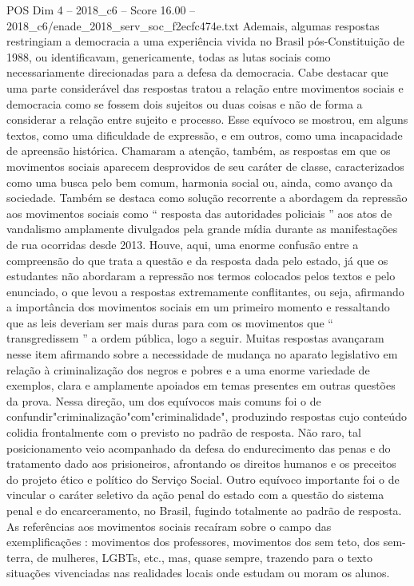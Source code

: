 \begin{textsample}{POS Dim 4 – 2018\_c6 – Score 16.00 – 2018\_c6/enade\_2018\_serv\_soc\_f2ecfc474e.txt}
Ademais, algumas respostas restringiam a democracia a uma experiência vivida no Brasil pós-Constituição de 1988, ou identificavam, genericamente, todas as lutas sociais como necessariamente direcionadas para a defesa da democracia.
Cabe destacar que uma parte considerável das respostas tratou a relação entre movimentos sociais e democracia como se fossem dois sujeitos ou duas coisas e não de forma a considerar a relação entre sujeito e processo.
Esse equívoco se mostrou, em alguns textos, como uma dificuldade de expressão, e em outros, como uma incapacidade de apreensão histórica.
Chamaram a atenção, também, as respostas em que os movimentos sociais aparecem desprovidos de seu caráter de classe, caracterizados como uma busca pelo bem comum, harmonia social ou, ainda, como avanço da sociedade.
Também se destaca como solução recorrente a abordagem da repressão aos movimentos sociais como “ resposta das autoridades policiais ” aos atos de vandalismo amplamente divulgados pela grande mídia durante as manifestações de rua ocorridas desde 2013.
Houve, aqui, uma enorme confusão entre a compreensão do que trata a questão e da resposta dada pelo estado, já que os estudantes não abordaram a repressão nos termos colocados pelos textos e pelo enunciado, o que levou a respostas extremamente conflitantes, ou seja, afirmando a importância dos movimentos sociais em um primeiro momento e ressaltando que as leis deveriam ser mais duras para com os movimentos que “ transgredissem ” a ordem pública, logo a seguir.
Muitas respostas avançaram nesse item afirmando sobre a necessidade de mudança no aparato legislativo em relação à criminalização dos negros e pobres e a uma enorme variedade de exemplos, clara e amplamente apoiados em temas presentes em outras questões da prova.
Nessa direção, um dos equívocos mais comuns foi o de confundir"criminalização"com"criminalidade", produzindo respostas cujo conteúdo colidia frontalmente com o previsto no padrão de resposta.
Não raro, tal posicionamento veio acompanhado da defesa do endurecimento das penas e do tratamento dado aos prisioneiros, afrontando os direitos humanos e os preceitos do projeto ético e político do Serviço Social.
Outro equívoco importante foi o de vincular o caráter seletivo da ação penal do estado com a questão do sistema penal e do encarceramento, no Brasil, fugindo totalmente ao padrão de resposta.
As referências aos movimentos sociais recaíram sobre o campo das exemplificações : movimentos dos professores, movimentos dos sem teto, dos sem-terra, de mulheres, LGBTs, etc., mas, quase sempre, trazendo para o texto situações vivenciadas nas realidades locais onde estudam ou moram os alunos.

\end{textsample}
